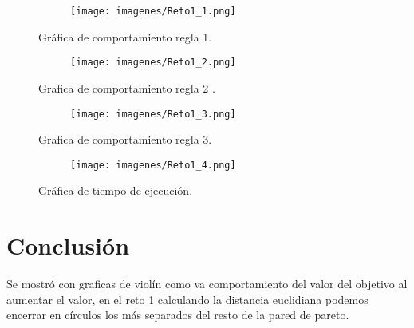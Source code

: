 \documentclass{article}
\begin{document}
\begin{figure}[H]
\centering
\begin{subfigure}[b]{1.0\linewidth}
\texttt{[image: imagenes/Reto1\_1.png]}
\end{subfigure}
\caption{Gráfica de comportamiento regla 1.}
\label{fig:westminster}
\end{figure}


\begin{figure}[H]
\centering
\begin{subfigure}[b]{1.0\linewidth}
\texttt{[image: imagenes/Reto1\_2.png]}
\end{subfigure}
\caption{Grafica de comportamiento regla 2 .}
\label{fig:westminster}
\end{figure}



\begin{figure}[H]
\centering
\begin{subfigure}[b]{1.0\linewidth}
\texttt{[image: imagenes/Reto1\_3.png]}
\end{subfigure}
\caption{Grafica de comportamiento regla 3.}
\label{fig:westminster}
\end{figure}
\begin{figure}[H]
\centering
\begin{subfigure}[b]{1.0\linewidth}
\texttt{[image: imagenes/Reto1\_4.png]}
\end{subfigure}
\caption{Gráfica de tiempo de ejecución.}
\label{fig:westminster}
\end{figure}





 \section{Conclusión}
Se mostró con graficas de violín como va comportamiento del valor del objetivo al aumentar el valor, en el reto 1 calculando la distancia euclidiana podemos encerrar en círculos los más separados del resto de la pared de pareto.  

 
 

 
\end{document}
